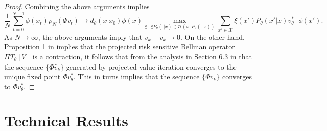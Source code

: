 \begin{proof}
Combining the above arguments implies
\[
\frac{1}{N}\sum_{t=0}^{N-1} \phi(x_t){\rho}_N(\Phi v_t)\rightarrow d_\theta(x|x_0)\phi(x)\max_{\xi\,:\,\xi P_\theta(\cdot|x)\in\mathcal U(x,P_\theta(\cdot|x))}\sum_{x'\in\mathcal X}\xi(x') P_\theta(x'|x){v_\theta^*}^\top\phi\left(x'\right) .
\]
As $N\rightarrow\infty$, the above arguments imply that $v_k-\widehat{v}_k\rightarrow 0$. On the other hand, Proposition 1  in \citet{tamar2014robust} implies that the projected risk sensitive Bellman operator $\Pi T_\theta[V]$ is a contraction, it follows that from the analysis in Section 6.3 in \citet{Ber2012DynamicProgramming} that the sequence $\{\Phi \widehat{v}_k\}$ generated by projected value iteration converges to the unique fixed point $\Phi v_\theta^*$. This in turns implies that the sequence $\{\Phi v_k\}$ converges to $\Phi v_\theta^*$.
\end{proof}



\section{Technical Results }\label{sec:SAA_PGA}

